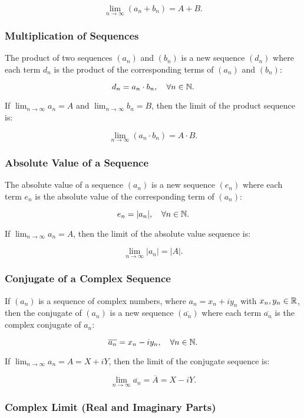 \[
    \lim_{n \to \infty} (a_n + b_n) = A + B.
\]

\subsubsection{Multiplication of Sequences}

The product of two sequences \((a_n)\) and \((b_n)\) is a new sequence \((d_n)\) where each term \(d_n\) 
is the product of the corresponding terms of \((a_n)\) and \((b_n)\):

\[
    d_n = a_n \cdot b_n, \quad \forall n \in \mathbb{N}.
\]

If \(\lim_{n \to \infty} a_n = A\) and \(\lim_{n \to \infty} b_n = B\), then the limit of the product sequence is:

\[
    \lim_{n \to \infty} (a_n \cdot b_n) = A \cdot B.
\]

\subsubsection{Absolute Value of a Sequence}

The absolute value of a sequence \((a_n)\) is a new sequence \((e_n)\) where each term \(e_n\) is the absolute value of the corresponding term of \((a_n)\):

\[
    e_n = |a_n|, \quad \forall n \in \mathbb{N}.
\]

If \(\lim_{n \to \infty} a_n = A\), then the limit of the absolute value sequence is:

\[
    \lim_{n \to \infty} |a_n| = |A|.
\]

\subsubsection{Conjugate of a Complex Sequence}

If \((a_n)\) is a sequence of complex numbers, where \(a_n = x_n + i y_n\) with \(x_n, y_n \in \mathbb{R}\), then the conjugate of \((a_n)\) is a new sequence \((\overline{a_n})\) where each term \(\overline{a_n}\) is the complex conjugate of \(a_n\):

\[
    \overline{a_n} = x_n - i y_n, \quad \forall n \in \mathbb{N}.
\]

If \(\lim_{n \to \infty} a_n = A = X + i Y\), then the limit of the conjugate sequence is:

\[
    \lim_{n \to \infty} \overline{a_n} = \overline{A} = X - i Y.
\]

\subsubsection{Complex Limit (Real and Imaginary Parts)}


